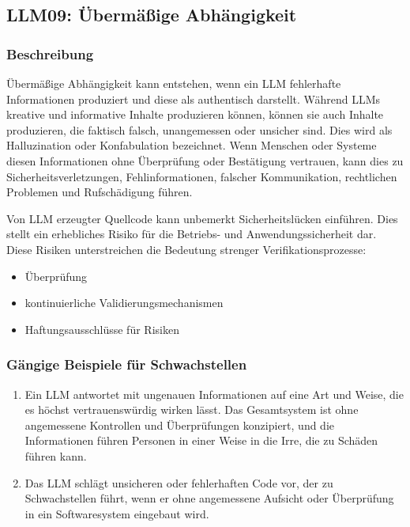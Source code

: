 \documentclass[
]{article}
\author{}
\date{}
\providecommand{\tightlist}{%
  \setlength{\itemsep}{0pt}\setlength{\parskip}{0pt}}
\begin{document}
\subsection{LLM09: Übermäßige
Abhängigkeit}\label{llm09-uxfcbermuxe4uxdfige-abhuxe4ngigkeit}

\subsubsection{Beschreibung}\label{beschreibung}

Übermäßige Abhängigkeit kann entstehen, wenn ein LLM fehlerhafte
Informationen produziert und diese als authentisch darstellt. Während
LLMs kreative und informative Inhalte produzieren können, können sie
auch Inhalte produzieren, die faktisch falsch, unangemessen oder
unsicher sind. Dies wird als Halluzination oder Konfabulation
bezeichnet. Wenn Menschen oder Systeme diesen Informationen ohne
Überprüfung oder Bestätigung vertrauen, kann dies zu
Sicherheitsverletzungen, Fehlinformationen, falscher Kommunikation,
rechtlichen Problemen und Rufschädigung führen.

Von LLM erzeugter Quellcode kann unbemerkt Sicherheitslücken einführen.
Dies stellt ein erhebliches Risiko für die Betriebs- und
Anwendungssicherheit dar. Diese Risiken unterstreichen die Bedeutung
strenger Verifikationsprozesse:

\begin{itemize}
\tightlist
\item
  Überprüfung
\item
  kontinuierliche Validierungsmechanismen
\item
  Haftungsausschlüsse für Risiken
\end{itemize}

\subsubsection{Gängige Beispiele für
Schwachstellen}\label{guxe4ngige-beispiele-fuxfcr-schwachstellen}

\begin{enumerate}
\def\labelenumi{\arabic{enumi}.}
\tightlist
\item
  Ein LLM antwortet mit ungenauen Informationen auf eine Art und Weise,
  die es höchst vertrauenswürdig wirken lässt. Das Gesamtsystem ist ohne
  angemessene Kontrollen und Überprüfungen konzipiert, und die
  Informationen führen Personen in einer Weise in die Irre, die zu
  Schäden führen kann.
\item
  Das LLM schlägt unsicheren oder fehlerhaften Code vor, der zu
  Schwachstellen führt, wenn er ohne angemessene Aufsicht oder
  Überprüfung in ein Softwaresystem eingebaut wird.
\end{enumerate}
\end{document}
